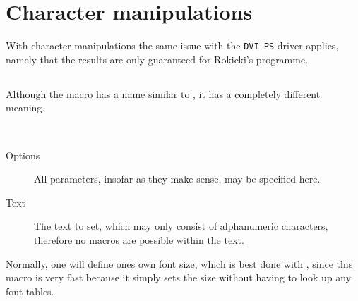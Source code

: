 \documentclass[fontsize=11pt,english,BCOR=10mm,DIV=12,bibliography=totoc,parskip=false,
   headings=small, headinclude=false,footinclude=false,oneside,abstract=on]{pst-doc}
\begin{document}
\section{Character manipulations}\label{sec:psttext:Zeichenmanipulationen}
With character manipulations the same issue with the \verb+DVI-PS+ driver applies, 
namely that the results are only guaranteed for Rokicki's 
 programme.

\subsection{}\label{sec:psttext:pscharpath}
Although the macro  has a name similar to , it has a 
completely different meaning.
%
\begin{BDef}
\OptArgs{}\\
\OptArgs{}
\end{BDef}

\begin{description}
\item[Options] All \PST parameters, insofar as they make sense, may be
	specified here.
\item[Text] The text to set, which may only consist of alphanumeric
	characters, therefore no macros are possible within the text.
\end{description}

Normally, one will define ones own font size, which is best  done with 
, since this macro is very
fast because it simply sets the size without having to look up any font tables.

\medskip\noindent
\begin{LTXexample}[width=6.5cm,pos=l]
\\
\\
\\
\end{LTXexample}
\end{document}
